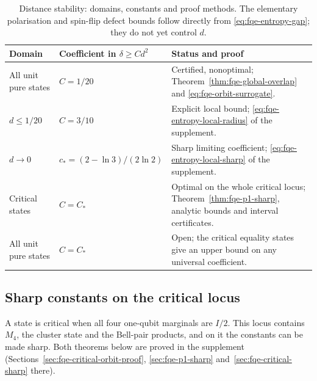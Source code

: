 \begin{table}[htbp]
\centering\small
\begin{tabular}{@{}p{.22\linewidth}p{.22\linewidth}p{.44\linewidth}@{}}
\toprule
Domain & Coefficient in $\delta\ge Cd^2$ & Status and proof \\
\midrule
All unit pure states & $C=1/20$ & Certified, nonoptimal; Theorem~\ref{thm:fqe-global-overlap} and \eqref{eq:fqe-orbit-surrogate}. \\[3pt]
$d\le1/20$ & $C=3/10$ & Explicit local bound; \eqref{eq:fqe-entropy-local-radius} of the supplement. \\[3pt]
$d\to0$ & $c_*=(2-\ln3)/(2\ln2)$ & Sharp limiting coefficient; \eqref{eq:fqe-entropy-local-sharp} of the supplement. \\[3pt]
Critical states & $C=C_*$ & Optimal on the whole critical locus; Theorem~\ref{thm:fqe-p1-sharp}, analytic bounds and interval certificates. \\[3pt]
All unit pure states & $C=C_*$ & Open; the critical equality states give an upper bound on any universal coefficient. \\
\bottomrule
\end{tabular}
\caption{Distance stability: domains, constants and proof methods. The elementary polarisation and
spin-flip defect bounds follow directly from \eqref{eq:fqe-entropy-gap}; they do not yet control $d$.}
\label{tab:fqe-stability-scope}
\end{table}

\subsection{Sharp constants on the critical locus}
\label{sec:fqe-critical-orbit-stability}
A state is critical when all four one-qubit marginals are $I/2$. This locus contains $M_4$, the cluster state and the
Bell-pair products, and on it the constants can be made sharp. Both theorems below are proved in the
supplement~\cite{Companion} (Sections~\ref{sec:fqe-critical-orbit-proof}, \ref{sec:fqe-p1-sharp} and~\ref{sec:fqe-critical-sharp} there).

